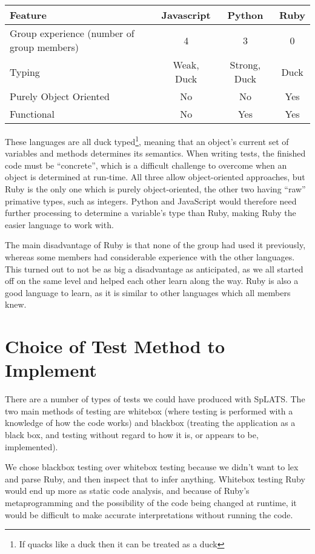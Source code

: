  \begin{tabular}{| l | c | c | c |}
  \hline
  \textbf{Feature} & \textbf{Javascript} & \textbf{Python} & \textbf{Ruby} \\
  \hline
  Group experience (number of group members) & 4 & 3 & 0 \\
  \hline
  Typing & Weak, Duck & Strong, Duck & Duck \\
  \hline
  Purely Object Oriented & No & No & Yes \\
  \hline
  Functional & No & Yes & Yes \\
  \hline
  \end{tabular}
  
These languages are all duck typed\footnote{If quacks like a duck then it can be treated as a duck}, meaning that an object's current set of variables and methods determines its semantics. When writing tests, the finished code must be ``concrete'', which is a difficult challenge to overcome when an object is determined at run-time.
All three allow object-oriented approaches, but Ruby is the only one which is purely object-oriented, the other two having ``raw'' primative types, such as integers. Python and JavaScript would therefore need further processing to determine a variable's type than Ruby, making Ruby the easier language to work with.

The main disadvantage of Ruby is that none of the group had used it previously, whereas some members had considerable experience with the other languages. This turned out to not be as big a disadvantage as anticipated, as we all started off on the same level and helped each other learn along the way. Ruby is also a good language to learn, as it is similar to other languages which all members knew.

\section{Choice of Test Method to Implement}
  There are a number of types of tests we could have produced with SpLATS.
  The two main methods of testing are whitebox (where testing is performed
  with a knowledge of how the code works) and blackbox (treating the
  application as a black box, and testing without regard to how it is, or
  appears to be, implemented).

  We chose blackbox testing over whitebox testing because we didn't want to lex and parse Ruby, and then inspect that to infer anything. Whitebox testing Ruby would end up more as static code analysis, and because of Ruby's metaprogramming and the possibility of the code being changed at runtime, it would be difficult to make accurate interpretations without running the code.


